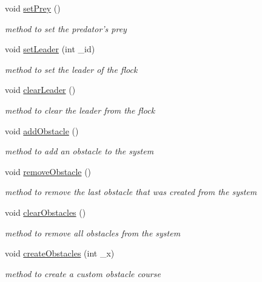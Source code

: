 \begin{DoxyCompactItemize}
void \hyperlink{classWorld_aa18cf24d003115671d485ad986aeb218}{setPrey} ()
\begin{DoxyCompactList}\small\item\em method to set the predator's prey \item\end{DoxyCompactList}\item 
void \hyperlink{classWorld_a2b306b8c1cc417a1d3d6ea9cde21b3a8}{setLeader} (int \_\-id)
\begin{DoxyCompactList}\small\item\em method to set the leader of the flock \item\end{DoxyCompactList}\item 
void \hyperlink{classWorld_a3da235a0341b5a0b614f2321c689f3ad}{clearLeader} ()
\begin{DoxyCompactList}\small\item\em method to clear the leader from the flock \item\end{DoxyCompactList}\item 
void \hyperlink{classWorld_a03ab08f45d5c960736fe00cc58f9d304}{addObstacle} ()
\begin{DoxyCompactList}\small\item\em method to add an obstacle to the system \item\end{DoxyCompactList}\item 
void \hyperlink{classWorld_a167f5e799706553e9b75ae7f7f28a665}{removeObstacle} ()
\begin{DoxyCompactList}\small\item\em method to remove the last obstacle that was created from the system \item\end{DoxyCompactList}\item 
void \hyperlink{classWorld_aa1f1e0468ad1490b2e4fa72852ac1eac}{clearObstacles} ()
\begin{DoxyCompactList}\small\item\em method to remove all obstacles from the system \item\end{DoxyCompactList}\item 
void \hyperlink{classWorld_ac875e2437e2493c3f5c5ca7c0a2949ae}{createObstacles} (int \_\-x)
\begin{DoxyCompactList}\small\item\em method to create a custom obstacle course \item\end{DoxyCompactList}\item 

\end{DoxyCompactItemize}
